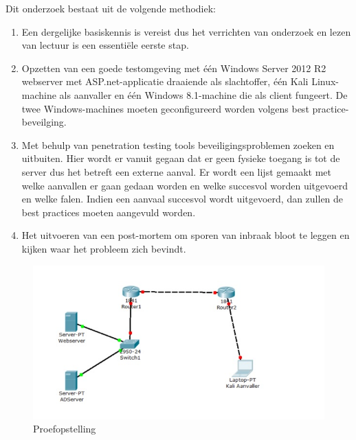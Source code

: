 \documentclass[pdftex,a4paper,12pt]{report}
\begin{document}

Dit onderzoek bestaat uit de volgende methodiek:
\begin{enumerate}
	\item Een dergelijke basiskennis is vereist dus het verrichten van onderzoek en lezen van lectuur is een essentiële eerste stap.
	\item Opzetten van een goede testomgeving met één Windows Server 2012 R2 webserver met ASP.net-applicatie draaiende als slachtoffer, één Kali Linux-machine als aanvaller en één Windows 8.1-machine die als client fungeert. De twee Windows-machines moeten geconfigureerd worden volgens best practice-beveilging.
	\item Met behulp van penetration testing tools beveiligingsproblemen zoeken en uitbuiten. Hier wordt er vanuit gegaan dat er geen fysieke toegang is tot de server dus het betreft een externe aanval. Er wordt een lijst gemaakt met welke aanvallen er gaan gedaan worden en welke succesvol worden uitgevoerd en welke falen. Indien een aanvaal succesvol wordt uitgevoerd, dan zullen de best practices moeten aangevuld worden.
	\item Het uitvoeren van een post-mortem om sporen van inbraak bloot te leggen en kijken waar het probleem zich bevindt.
\end{enumerate}

\begin{figure}[h!]
\begin{center}
\includegraphics{img/Situatie}
\end{center}
\caption{Proefopstelling}
\end{figure}
\end{document}
